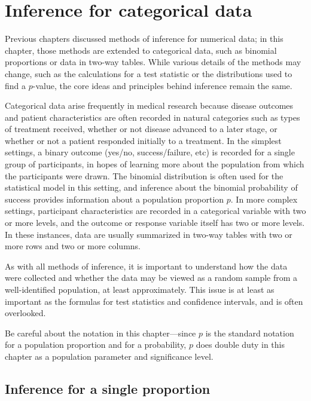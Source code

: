 

\chapter{Inference for categorical data}
\label{inferenceForCategoricalData}

Previous chapters discussed methods of inference for numerical data; in this chapter, those methods are extended to categorical data, such as binomial proportions or data in two-way tables. While various details of the methods may change, such as the calculations for a test statistic or the distributions used to find a $p$-value, the core ideas and principles behind inference remain the same.  

Categorical data arise frequently in medical research because disease outcomes and patient characteristics are often recorded in natural categories such as types of treatment received, whether or not disease advanced to a later stage, or whether or not a patient responded initially to a treatment. In the simplest settings, a binary outcome (yes/no, success/failure, etc)  is recorded for a single group of participants, in hopes of learning more about the population from which the participants were drawn.  The binomial distribution is often used for the statistical model in this setting, and inference about the binomial probability of success provides information about a population proportion $p$.   In more complex settings, participant characteristics are recorded in a categorical variable with two or more levels, and the outcome or response variable itself has two or more levels.  In these instances, data are usually summarized in two-way tables with two or more rows and two or more columns.

As  with all methods of inference, it is important to understand how the data were collected and whether the data may be viewed as a random sample from a well-identified population, at least approximately.  This issue is at least as important as the formulas for test statistics and confidence intervals, and is often overlooked.

Be careful about the notation in this chapter---since $p$ is the standard notation for a population proportion and for a probability, $p$ does double duty in this chapter as a population parameter and significance level. 

\section{Inference for a single proportion}
\label{singleProportion}


